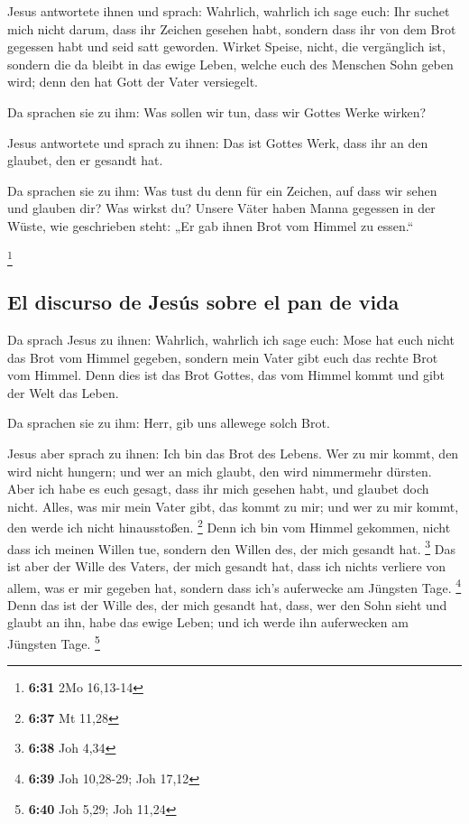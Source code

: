  Jesus antwortete ihnen und sprach: Wahrlich, wahrlich
ich sage euch: Ihr suchet mich nicht darum, dass ihr Zeichen gesehen
habt, sondern dass ihr von dem Brot gegessen habt und seid satt
geworden.  Wirket Speise, nicht, die vergänglich ist,
sondern die da bleibt in das ewige Leben, welche euch des Menschen Sohn
geben wird; denn den hat Gott der Vater versiegelt.

 Da sprachen sie zu ihm: Was sollen wir tun, dass wir
Gottes Werke wirken?

 Jesus antwortete und sprach zu ihnen: Das ist Gottes
Werk, dass ihr an den glaubet, den er gesandt hat.

 Da sprachen sie zu ihm: Was tust du denn für ein
Zeichen, auf dass wir sehen und glauben dir? Was wirkst du?
 Unsere Väter haben Manna gegessen in der Wüste, wie
geschrieben steht: „Er gab ihnen Brot vom Himmel zu essen.``

\footnote{\textbf{6:31} 2Mo 16,13-14}

\hypertarget{el-discurso-de-jesuxfas-sobre-el-pan-de-vida}{%
\subsection{El discurso de Jesús sobre el pan de
vida}\label{el-discurso-de-jesuxfas-sobre-el-pan-de-vida}}

 Da sprach Jesus zu ihnen: Wahrlich, wahrlich ich sage
euch: Mose hat euch nicht das Brot vom Himmel gegeben, sondern mein
Vater gibt euch das rechte Brot vom Himmel.  Denn dies
ist das Brot Gottes, das vom Himmel kommt und gibt der Welt das Leben.

 Da sprachen sie zu ihm: Herr, gib uns allewege solch
Brot.

 Jesus aber sprach zu ihnen: Ich bin das Brot des Lebens.
Wer zu mir kommt, den wird nicht hungern; und wer an mich glaubt, den
wird nimmermehr dürsten.  Aber ich habe es euch gesagt,
dass ihr mich gesehen habt, und glaubet doch nicht. 
Alles, was mir mein Vater gibt, das kommt zu mir; und wer zu mir kommt,
den werde ich nicht hinausstoßen. \footnote{\textbf{6:37} Mt 11,28}
 Denn ich bin vom Himmel gekommen, nicht dass ich meinen
Willen tue, sondern den Willen des, der mich gesandt hat. \footnote{\textbf{6:38}
  Joh 4,34}  Das ist aber der Wille des Vaters, der mich
gesandt hat, dass ich nichts verliere von allem, was er mir gegeben hat,
sondern dass ich's auferwecke am Jüngsten Tage. \footnote{\textbf{6:39}
  Joh 10,28-29; Joh 17,12}  Denn das ist der Wille des,
der mich gesandt hat, dass, wer den Sohn sieht und glaubt an ihn, habe
das ewige Leben; und ich werde ihn auferwecken am Jüngsten Tage.
\footnote{\textbf{6:40} Joh 5,29; Joh 11,24}

